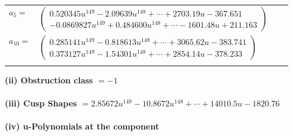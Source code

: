 \documentclass[1p]{elsarticle_modified}
\theoremstyle{definition}
\begin{document}
\begin{tabular}{m{7pt} m{180pt} m{7pt} m{180pt} }
\flushright $a_{5}=$&$\begin{pmatrix}0.520345 u^{149}-2.09639 u^{148}+\cdots+2703.19 u-367.651\\-0.0869827 u^{149}+0.484600 u^{148}+\cdots-1601.48 u+211.163\end{pmatrix}$ \\
\flushright $a_{10}=$&$\begin{pmatrix}0.285141 u^{149}-0.818613 u^{148}+\cdots+3065.62 u-383.741\\0.373127 u^{149}-1.54301 u^{148}+\cdots+2854.14 u-378.233\end{pmatrix}$\\&\end{tabular}
\flushleft \textbf{(ii) Obstruction class $= -1$}\\~\\
\flushleft \textbf{(iii) Cusp Shapes $= 2.85672 u^{149}-10.8672 u^{148}+\cdots+14010.5 u-1820.76$}\\~\\
\newpage\renewcommand{\arraystretch}{1}
\flushleft \textbf{(iv) u-Polynomials at the component}\newline \\
\end{document}
